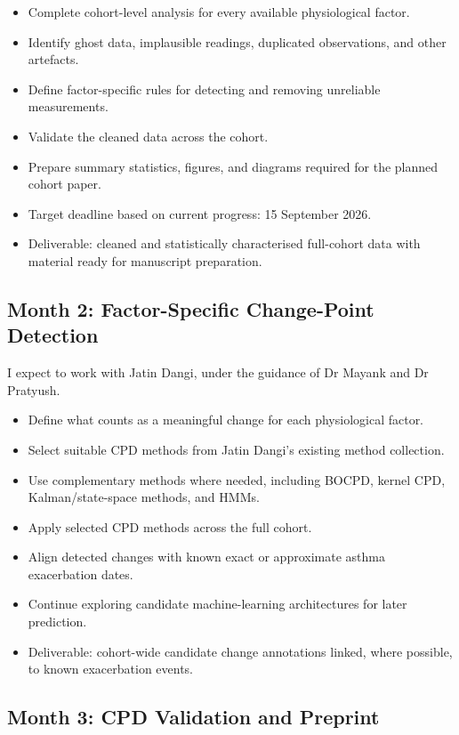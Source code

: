 \documentclass[10pt,a4paper]{article}
\begin{document}
\begin{itemize}
    \item Complete cohort-level analysis for every available physiological factor.
    \item Identify ghost data, implausible readings, duplicated observations, and other artefacts.
    \item Define factor-specific rules for detecting and removing unreliable measurements.
    \item Validate the cleaned data across the cohort.
    \item Prepare summary statistics, figures, and diagrams required for the planned cohort paper.
    \item Target deadline based on current progress: 15 September 2026.
    \item Deliverable: cleaned and statistically characterised full-cohort data with material ready for manuscript preparation.
\end{itemize}

\subsection{Month 2: Factor-Specific Change-Point Detection}

I expect to work with Jatin Dangi, under the guidance of Dr Mayank and Dr Pratyush.

\begin{itemize}
    \item Define what counts as a meaningful change for each physiological factor.
    \item Select suitable CPD methods from Jatin Dangi's existing method collection.
    \item Use complementary methods where needed, including BOCPD, kernel CPD, Kalman/state-space methods, and HMMs.
    \item Apply selected CPD methods across the full cohort.
    \item Align detected changes with known exact or approximate asthma exacerbation dates.
    \item Continue exploring candidate machine-learning architectures for later prediction.
    \item Deliverable: cohort-wide candidate change annotations linked, where possible, to known exacerbation events.
\end{itemize}

\subsection{Month 3: CPD Validation and Preprint}
\end{document}
